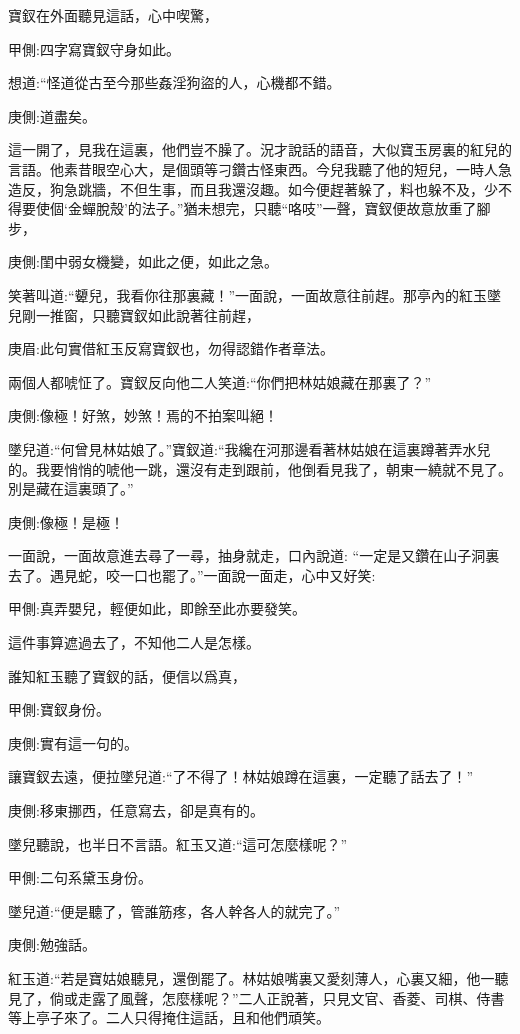 \begin{parag}
    寶釵在外面聽見這話，心中喫驚，\begin{note}甲側:四字寫寶釵守身如此。\end{note}想道:“怪道從古至今那些姦淫狗盜的人，心機都不錯。\begin{note}庚側:道盡矣。\end{note}這一開了，見我在這裏，他們豈不臊了。況才說話的語音，大似寶玉房裏的紅兒的言語。他素昔眼空心大，是個頭等刁鑽古怪東西。今兒我聽了他的短兒，一時人急造反，狗急跳牆，不但生事，而且我還沒趣。如今便趕著躲了，料也躲不及，少不得要使個‘金蟬脫殼’的法子。”猶未想完，只聽“咯吱”一聲，寶釵便故意放重了腳步，\begin{note}庚側:閨中弱女機變，如此之便，如此之急。\end{note}笑著叫道:“顰兒，我看你往那裏藏！”一面說，一面故意往前趕。那亭內的紅玉墜兒剛一推窗，只聽寶釵如此說著往前趕，\begin{note}庚眉:此句實借紅玉反寫寶釵也，勿得認錯作者章法。\end{note}兩個人都唬怔了。寶釵反向他二人笑道:“你們把林姑娘藏在那裏了？”\begin{note}庚側:像極！好煞，妙煞！焉的不拍案叫絕！\end{note}墜兒道:“何曾見林姑娘了。”寶釵道:“我纔在河那邊看著林姑娘在這裏蹲著弄水兒的。我要悄悄的唬他一跳，還沒有走到跟前，他倒看見我了，朝東一繞就不見了。別是藏在這裏頭了。”\begin{note}庚側:像極！是極！\end{note}一面說，一面故意進去尋了一尋，抽身就走，口內說道: “一定是又鑽在山子洞裏去了。遇見蛇，咬一口也罷了。”一面說一面走，心中又好笑:\begin{note}甲側:真弄嬰兒，輕便如此，即餘至此亦要發笑。\end{note}這件事算遮過去了，不知他二人是怎樣。
\end{parag}


\begin{parag}
    誰知紅玉聽了寶釵的話，便信以爲真，\begin{note}甲側:寶釵身份。\end{note}\begin{note}庚側:實有這一句的。\end{note}讓寶釵去遠，便拉墜兒道:“了不得了！林姑娘蹲在這裏，一定聽了話去了！”\begin{note}庚側:移東挪西，任意寫去，卻是真有的。\end{note}墜兒聽說，也半日不言語。紅玉又道:“這可怎麼樣呢？”\begin{note}甲側:二句系黛玉身份。\end{note}墜兒道:“便是聽了，管誰筋疼，各人幹各人的就完了。”\begin{note}庚側:勉強話。\end{note}紅玉道:“若是寶姑娘聽見，還倒罷了。林姑娘嘴裏又愛刻薄人，心裏又細，他一聽見了，倘或走露了風聲，怎麼樣呢？”二人正說著，只見文官、香菱、司棋、侍書等上亭子來了。二人只得掩住這話，且和他們頑笑。
\end{parag}


